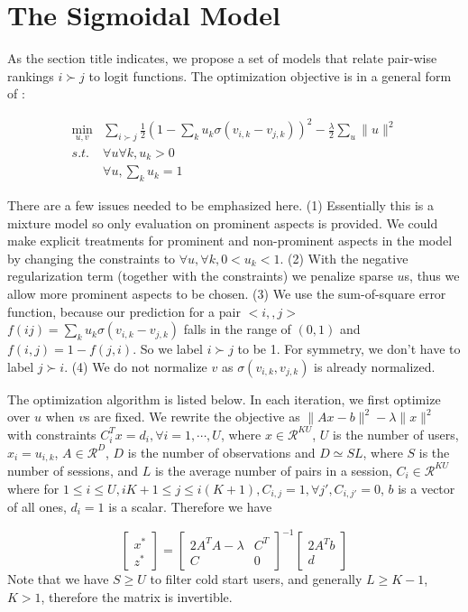 \documentclass[11pt]{report}
\newcommand{\Real}{\mathcal{R}}
\begin{document}
 
\section{The Sigmoidal Model}
As the section title indicates, we propose a set of models that relate pair-wise rankings $i\succ j$ to logit functions. The optimization objective is in a general form of :

\begin{eqnarray}
\min_{u,v} & \sum_{i\succ j} \frac{1}{2} (1-\sum_k u_k \sigma(v_{i,k}-v_{j,k}))^2 - \frac{\lambda}{2} \sum_u \|u\|^2 \\\nonumber
 s.t. & \forall u \forall k, u_k>0\\\nonumber
  & \forall u, \sum_k u_k=1
\end{eqnarray}

There are a few issues needed to be emphasized here. (1) Essentially this is a mixture model so only evaluation on prominent aspects is provided. We could make explicit treatments for prominent and non-prominent aspects in the model by changing the constraints to $\forall u,\forall k, 0<u_k<1$. (2) With the negative regularization term (together with the constraints) we penalize sparse $u$s, thus we allow more prominent aspects to be chosen. (3) We use the sum-of-square error function, because our prediction for a pair $<i,,j>$$f(i j)=\sum_k u_k \sigma(v_{i,k}-v_{j,k})$ falls in the range of $(0,1)$ and $f(i,j)=1-f(j,i)$. So we label $i\succ j$ to be 1. For symmetry, we don't have to label $j\succ i$. (4) We do not normalize $v$ as $\sigma(v_{i,k}, v_{j,k})$ is already normalized.

The optimization algorithm is listed below. In each iteration, we first optimize over $u$ when $v$s are fixed. We rewrite the objective as $\|Ax-b\|^2-\lambda \|x\|^2$ with constraints $C_i^Tx=d_i, \forall i=1,\cdots,U$, where $x\in \Real^{KU}$, $U$ is the number of users, $x_i=u_{i,k}$, $A\in \Real^{D}$, $D$ is the number of observations and $D\simeq SL$, where $S$ is the number of sessions, and $L$ is the average number of pairs in a session, $C_i\in \Real^{KU}$ where for $1\leq i \leq U, iK+1\leq j \leq i(K+1), C_{i,j}=1, \forall j', C_{i,j'}=0$, $b$ is a vector of all ones, $d_i=1$ is a scalar. Therefore we have

\begin{equation}
\begin{bmatrix}
x^* \\
z^*
\end{bmatrix} = \begin{bmatrix}
2A^TA-\lambda & C^T \\
C & 0
\end{bmatrix}^{-1}
\begin{bmatrix}
2A^Tb \\
d
\end{bmatrix}
\end{equation}
Note that we have $S\geq U$ to filter cold start users, and generally $L\geq K-1$, $K>1$, therefore the matrix is invertible. 
\end{document}

